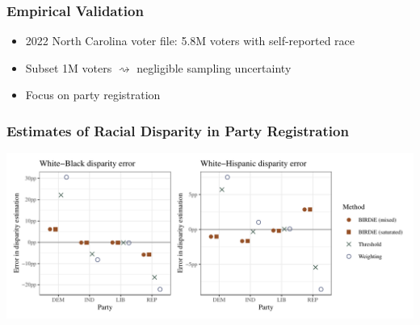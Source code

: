 \documentclass{beamer}
\begin{document}
\begin{frame}

  \frametitle{Empirical Validation}

  \begin{itemize}
  \item 2022 North Carolina voter file: 5.8M voters with
    self-reported race
  \item Subset 1M voters $\rightsquigarrow$ negligible sampling
    uncertainty

    \vfill
  \item Focus on party registration

  \end{itemize}

\end{frame}

\begin{frame}

  \frametitle{Estimates of Racial Disparity in Party Registration}

  \includegraphics[width=\textwidth]{../paper/figures/nc_disp.pdf}


\end{frame}
\end{document}

